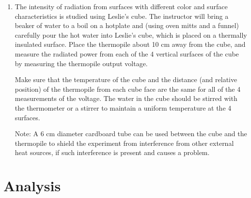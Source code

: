 \documentclass{article}
\begin{document}
\begin{enumerate}
\item \label{sec:lesliecube} The intensity of radiation from surfaces with different color and
surface characteristics is studied using Leslie's cube. The instructor will bring a
beaker of water to a boil on a hotplate and (using oven mitts and a
funnel) carefully pour the hot water into Leslie{\textquoteright}s
cube, which is placed on a thermally insulated surface.  Place the
thermopile about 10 cm away from the cube, and measure the radiated
power from each of the 4 vertical surfaces of the cube by measuring the
thermopile output voltage. 

Make sure that the temperature of the cube and the distance (and
relative position) of the thermopile from each cube face are the same
for all of the 4 measurements of the voltage.  The water in the cube
should be stirred with the thermometer or a stirrer to maintain a
uniform temperature at the 4 surfaces. 

Note:  A 6 cm diameter cardboard tube can be used between the cube and
the thermopile to shield the experiment from interference from other
external heat sources, if such interference is present and causes a
problem.

\end{enumerate}

\section{Analysis}
\end{document}
